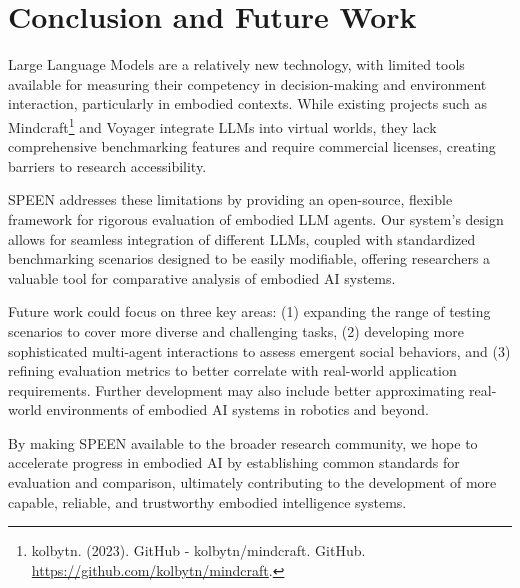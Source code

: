 \documentclass{article}
\begin{document}
\section{Conclusion and Future Work}
Large Language Models are a relatively new technology, with limited tools available for measuring their competency in decision-making and environment interaction, particularly in embodied contexts. While existing projects such as Mindcraft\footnote{kolbytn. (2023). GitHub - kolbytn/mindcraft. GitHub. \url{https://github.com/kolbytn/mindcraft}.} and Voyager integrate LLMs into virtual worlds, they lack comprehensive benchmarking features and require commercial licenses, creating barriers to research accessibility.

SPEEN addresses these limitations by providing an open-source, flexible framework for rigorous evaluation of embodied LLM agents.
Our system's design allows for seamless integration of different LLMs, coupled with standardized benchmarking scenarios designed to be easily modifiable, offering researchers a valuable tool for comparative analysis of embodied AI systems.

Future work could focus on three key areas: (1) expanding the range of testing scenarios to cover more diverse and challenging tasks, (2) developing more sophisticated multi-agent interactions to assess emergent social behaviors, and (3) refining evaluation metrics to better correlate with real-world application requirements.
Further development may also include better approximating real-world environments of embodied AI systems in robotics and beyond.

By making SPEEN available to the broader research community, we hope to accelerate progress in embodied AI by establishing common standards for evaluation and comparison, ultimately contributing to the development of more capable, reliable, and trustworthy embodied intelligence systems.
\end{document}
